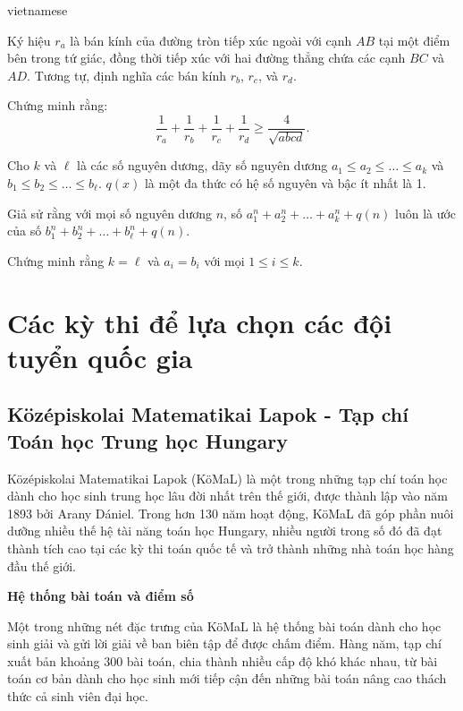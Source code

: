 \documentclass{article}
\begin{document}
\begin{otherlanguage*}{vietnamese}
\begin{problem*}
    Ký hiệu \( r_a \) là bán kính của đường tròn tiếp xúc ngoài với cạnh \( AB \) tại một điểm bên trong tứ giác,
    đồng thời tiếp xúc với hai đường thẳng chứa các cạnh \( BC \) và \( AD \). Tương tự, định nghĩa các bán kính \( r_b \), \( r_c \), và \( r_d \).  
    
    Chứng minh rằng:
    \[
        \frac{1}{r_a} + \frac{1}{r_b} + \frac{1}{r_c} + \frac{1}{r_d} \geq \frac{4}{\sqrt{abcd}}.
    \]
\end{problem*}

\begin{problem*}
    Cho \( k \) và \( \ell \) là các số nguyên dương, dãy số nguyên dương \( a_1 \leq a_2 \leq \dots \leq a_k \) và \( b_1 \leq b_2 \leq \dots \leq b_\ell \).
    \( q(x) \) là một đa thức có hệ số nguyên và bậc ít nhất là 1.  
    
    Giả sử rằng với mọi số nguyên dương \( n \), số $a_1^n + a_2^n + \dots + a_k^n + q(n)$ luôn là ước của số $b_1^n + b_2^n + \dots + b_\ell^n + q(n).$
    
    Chứng minh rằng \( k = \ell \) và \( a_i = b_i \) với mọi \( 1 \leq i \leq k \).
\end{problem*}

\newpage

\section{Các kỳ thi để lựa chọn các đội tuyển quốc gia}

\subsection{Középiskolai Matematikai Lapok - Tạp chí Toán học Trung học Hungary}

Középiskolai Matematikai Lapok (KöMaL) là một trong những tạp chí toán học dành cho học sinh trung học lâu đời nhất trên thế giới, được thành lập vào năm 1893 bởi Arany Dániel.
Trong hơn 130 năm hoạt động, KöMaL đã góp phần nuôi dưỡng nhiều thế hệ tài năng toán học Hungary,
nhiều người trong số đó đã đạt thành tích cao tại các kỳ thi toán quốc tế và trở thành những nhà toán học hàng đầu thế giới.

\textbf{Hệ thống bài toán và điểm số}

Một trong những nét đặc trưng của KöMaL là hệ thống bài toán dành cho học sinh giải và gửi lời giải về ban biên tập để được chấm điểm.
Hàng năm, tạp chí xuất bản khoảng 300 bài toán, chia thành nhiều cấp độ khó khác nhau,
từ bài toán cơ bản dành cho học sinh mới tiếp cận đến những bài toán nâng cao thách thức cả sinh viên đại học.


\end{otherlanguage*}
\end{document}
